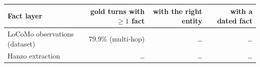 \begin{tabular}{lrrr}
\toprule
Fact layer & gold turns with $\geq 1$ fact & with the right entity & with a dated fact \\
\midrule
LoCoMo observations (dataset) & 79.9\% (multi-hop) & \ldots & \ldots \\
Hanzo extraction & \ldots & \ldots & \ldots \\
\bottomrule
\end{tabular}

